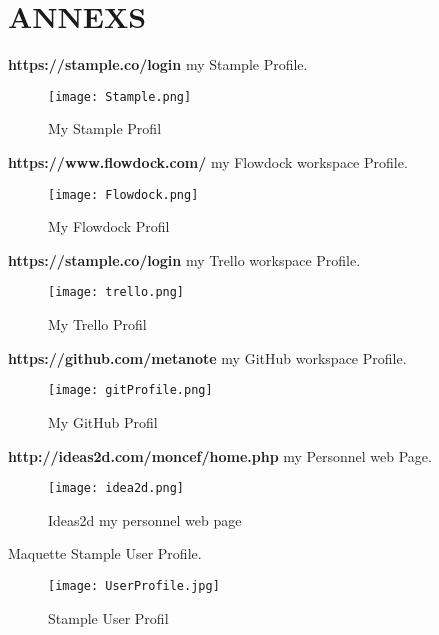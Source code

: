 \chapter{ANNEXS}

\textbf{https://stample.co/login} my Stample Profile.
\begin{figure}[H]
        \centering
                \centering
                \texttt{[image: Stample.png]}
		\caption{My Stample Profil}

               
\end{figure}
\newpage
\textbf{https://www.flowdock.com/} my Flowdock workspace Profile.
\begin{figure}[H]
        \centering
                \centering
                \texttt{[image: Flowdock.png]}
               \caption{My Flowdock Profil}

\end{figure}
\textbf{https://stample.co/login} my Trello workspace Profile.
\begin{figure}[H]
        \centering
                \centering
                \texttt{[image: trello.png]}
               	\caption{My Trello Profil}

\end{figure}
\newpage
\textbf{https://github.com/metanote} my GitHub workspace Profile.
\begin{figure}[H]
        \centering
                \centering
                \texttt{[image: gitProfile.png]}
               \caption{My GitHub Profil}

\end{figure}
\textbf{http://ideas2d.com/moncef/home.php} my Personnel web Page.
\begin{figure}[H]
        \centering
                \centering
                \texttt{[image: idea2d.png]}
               \caption{Ideas2d my personnel web page}

\end{figure}
\newpage
Maquette Stample User Profile.
\begin{figure}[H]
        \centering
                \centering
                \texttt{[image: UserProfile.jpg]}
               \caption{Stample User Profil}

\end{figure}